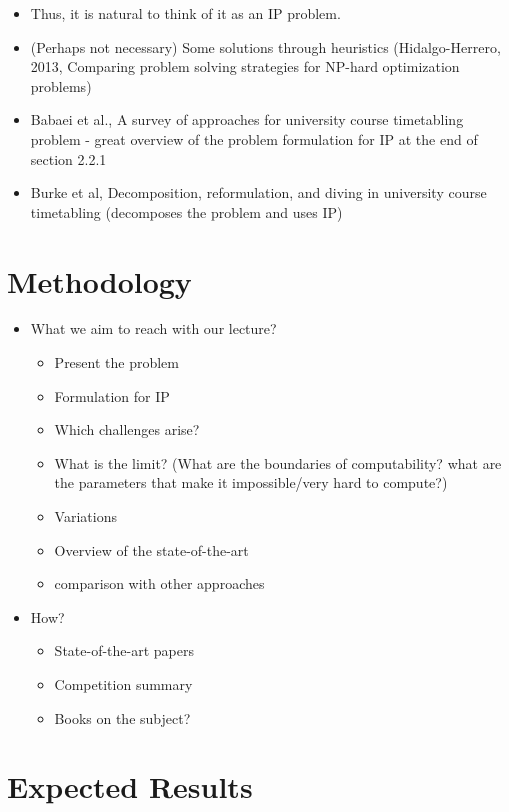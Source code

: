 \documentclass[a4paper]{report}
\begin{document}
\begin{itemize}
	\begin{itemize}
	    \item Thus, it is natural to think of it as an IP problem.
	    \item (Perhaps not necessary) Some solutions through heuristics (Hidalgo-Herrero, 2013, Comparing problem solving strategies for NP-hard optimization problems)
	    \item Babaei et al., A survey of approaches for university course timetabling problem - great overview of the problem formulation for IP at the end of section 2.2.1
	    \item Burke et al, Decomposition, reformulation, and diving in university course timetabling (decomposes the problem and uses IP)
	\end{itemize}
\end{itemize}
 
\section*{Methodology}

\begin{itemize}
    \item What we aim to reach with our lecture?
	\begin{itemize}
	    \item Present the problem
	    \item Formulation for IP
	    \item Which challenges arise?
	    \item What is the limit? (What are the boundaries of computability? what are the parameters that make it impossible/very hard to compute?)
	    \item Variations
	    \item Overview of the state-of-the-art
	    \item comparison with other approaches
	\end{itemize}
    \item How?
	\begin{itemize}
	    \item State-of-the-art papers
	    \item Competition summary
	    \item Books on the subject?
	\end{itemize}
\end{itemize}

\section*{Expected Results}
\end{document}
